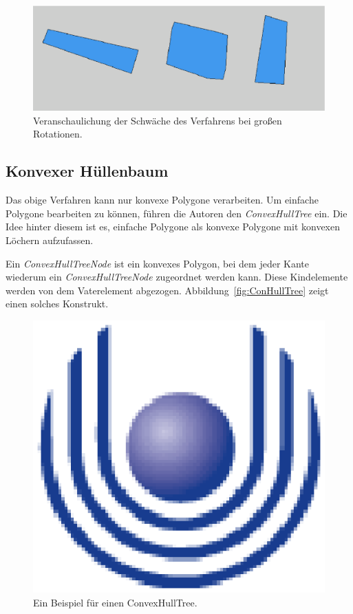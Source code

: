 \begin{figure}
	\centering
	\includegraphics[scale=0.6]{Rotation.eps}
	\caption[Veranschaulichung der Schwächen des Verfahrens für große Rotationen]{Veranschaulichung der Schwäche des Verfahrens bei großen Rotationen.}
	\label{fig:BeispielschlechteRot}
\end{figure}

\subsection{Konvexer Hüllenbaum}

Das obige Verfahren kann nur konvexe Polygone verarbeiten. Um einfache Polygone bearbeiten zu können, führen die Autoren den \textit{ConvexHullTree} ein. Die Idee hinter diesem ist es, einfache Polygone als konvexe Polygone mit konvexen Löchern aufzufassen. 

Ein \textit{ConvexHullTreeNode} ist ein konvexes Polygon, bei dem jeder Kante wiederum ein \textit{ConvexHullTreeNode} zugeordnet werden kann. Diese Kindelemente werden von dem Vaterelement abgezogen. Abbildung~\vref{fig:ConHullTree} zeigt einen solches Konstrukt.

\begin{figure}
	\centering
	\includegraphics{feu_logo2.eps}
	\caption{Ein Beispiel für einen ConvexHullTree.}
	\label{fig:ConHullTree}
\end{figure}

